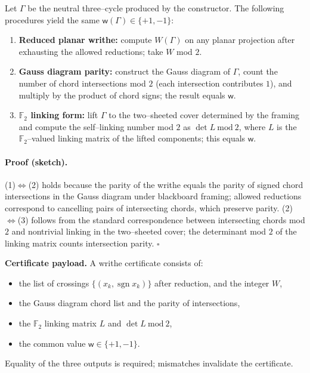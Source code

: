 \documentclass[11pt]{article}
\begin{document}
\begin{proposition}\label{prop:equiv}
Let $\Gamma$ be the neutral three–cycle produced by the constructor. The following procedures yield the same $\mathsf{w}(\Gamma)\in\{+1,-1\}$:
\begin{enumerate}
  \item \textbf{Reduced planar writhe:} compute $W(\Gamma)$ on any planar projection after exhausting the allowed reductions; take $W$ mod $2$.
  \item \textbf{Gauss diagram parity:} construct the Gauss diagram of $\Gamma$, count the number of chord intersections mod $2$ (each intersection contributes $1$), and multiply by the product of chord signs; the result equals $\mathsf{w}$.
  \item \textbf{$\mathbb{F}_2$ linking form:} lift $\Gamma$ to the two–sheeted cover determined by the framing and compute the self–linking number mod $2$ as $\det L \ \text{mod}\ 2$, where $L$ is the $\mathbb{F}_2$–valued linking matrix of the lifted components; this equals $\mathsf{w}$.
\end{enumerate}
\end{proposition}

\paragraph{Proof (sketch).}
(1)$\Leftrightarrow$(2) holds because the parity of the writhe equals the parity of signed chord intersections in the Gauss diagram under blackboard framing; allowed reductions correspond to cancelling pairs of intersecting chords, which preserve parity. (2)$\Leftrightarrow$(3) follows from the standard correspondence between intersecting chords mod $2$ and nontrivial linking in the two–sheeted cover; the determinant mod $2$ of the linking matrix counts intersection parity. \hfill$\square$

\medskip
\noindent\textbf{Certificate payload.} A writhe certificate consists of:
\begin{itemize}
  \item the list of crossings $\{(x_k,\operatorname{sgn}x_k)\}$ after reduction, and the integer $W$,
  \item the Gauss diagram chord list and the parity of intersections,
  \item the $\mathbb{F}_2$ linking matrix $L$ and $\det L\ \text{mod}\ 2$,
  \item the common value $\mathsf{w}\in\{+1,-1\}$.
\end{itemize}
Equality of the three outputs is required; mismatches invalidate the certificate.
\end{document}
